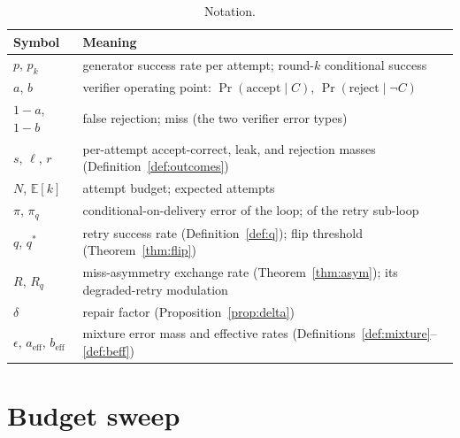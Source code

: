 \documentclass[10pt]{article}
\begin{document}
\begin{table}[htbp]
\centering\small
\caption{Notation.}
\label{tab:notation}
\begin{tabular}{ll}
\toprule
Symbol & Meaning \\
\midrule
$p$, $p_k$ & generator success rate per attempt; round-$k$ conditional success \\
$a$, $b$ & verifier operating point: $\Pr(\text{accept}\mid C)$, $\Pr(\text{reject}\mid \neg C)$ \\
$1-a$, $1-b$ & false rejection; miss (the two verifier error types) \\
$s$, $\ell$, $r$ & per-attempt accept-correct, leak, and rejection masses (Definition~\ref{def:outcomes}) \\
$N$, $\mathbb{E}[k]$ & attempt budget; expected attempts \\
$\pi$, $\pi_q$ & conditional-on-delivery error of the loop; of the retry sub-loop \\
$q$, $q^\ast$ & retry success rate (Definition~\ref{def:q}); flip threshold (Theorem~\ref{thm:flip}) \\
$R$, $R_q$ & miss-asymmetry exchange rate (Theorem~\ref{thm:asym}); its degraded-retry modulation \\
$\delta$ & repair factor (Proposition~\ref{prop:delta}) \\
$\epsilon$, $a_{\mathrm{eff}}$, $b_{\mathrm{eff}}$ & mixture error mass and effective rates (Definitions~\ref{def:mixture}--\ref{def:beff}) \\
\bottomrule
\end{tabular}
\end{table}

\section{Budget sweep}\label{app:budget}
\end{document}
